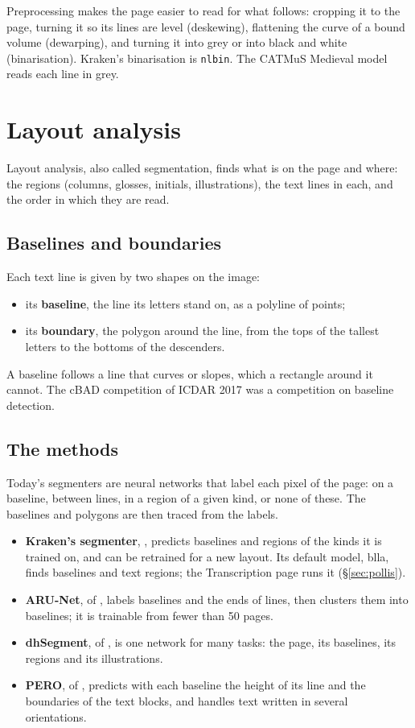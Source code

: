 Preprocessing makes the page easier to read for what follows: cropping it to the page, turning it so its lines are
level (deskewing), flattening the curve of a bound volume (dewarping), and turning it into grey or into black and
white (binarisation). Kraken's binarisation is \texttt{nlbin}. The CATMuS Medieval model reads each line in grey.

\section{Layout analysis}\label{sec:layout}
Layout analysis, also called segmentation, finds what is on the page and where: the regions (columns, glosses,
initials, illustrations), the text lines in each, and the order in which they are read.

\subsection{Baselines and boundaries}
Each text line is given by two shapes on the image:
\begin{itemize}
  \item its \textbf{baseline}, the line its letters stand on, as a polyline of points;
  \item its \textbf{boundary}, the polygon around the line, from the tops of the tallest letters to the bottoms of the
    descenders.
\end{itemize}
A baseline follows a line that curves or slopes, which a rectangle around it cannot. The cBAD competition of ICDAR
2017 was a competition on baseline detection.

\subsection{The methods}
Today's segmenters are neural networks that label each pixel of the page: on a baseline, between lines, in a region of
a given kind, or none of these. The baselines and polygons are then traced from the labels.
\begin{itemize}
  \item \textbf{Kraken's segmenter}, , predicts baselines and regions of the
    kinds it is trained on, and can be retrained for a new layout. Its default model, blla, finds baselines and text
    regions; the Transcription page runs it (\S\ref{sec:pollis}).
  \item \textbf{ARU-Net}, of , labels
    baselines and the ends of lines, then clusters them into baselines; it is trainable from fewer than 50 pages.
  \item \textbf{dhSegment}, of , is one network for many
    tasks: the page, its baselines, its regions and its illustrations.
  \item \textbf{PERO}, of , predicts with each baseline the height of its
    line and the boundaries of the text blocks, and handles text written in several orientations.
\end{itemize}


